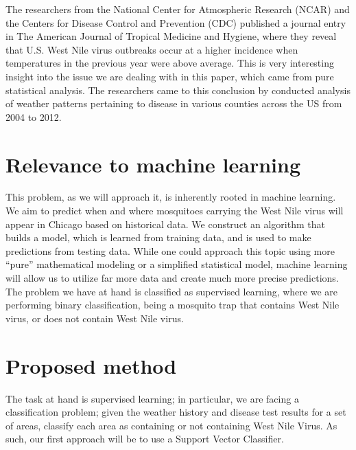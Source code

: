 \documentclass{article} %
\begin{document}
The researchers from the National Center for Atmospheric Research (NCAR) and the Centers for Disease Control and Prevention (CDC) published a journal entry in The American Journal of Tropical Medicine and Hygiene, where they reveal that U.S. West Nile virus outbreaks occur at a higher incidence when temperatures in the previous year were above average.  This is very interesting insight into the issue we are dealing with in this paper, which came from pure statistical analysis.  The researchers came to this conclusion by conducted analysis of weather patterns pertaining to disease in various counties across the US from 2004 to 2012.

\section{Relevance to machine learning}
This problem, as we will approach it, is inherently rooted in machine learning. We aim to predict when and where mosquitoes carrying the West Nile virus will appear in Chicago based on historical data. We construct an algorithm that builds a model, which is learned from training data, and is used to make predictions from testing data.  While one could approach this topic using more “pure” mathematical modeling or a simplified statistical model, machine learning will allow us to utilize far more data and create much more precise predictions.  The problem we have at hand is classified as supervised learning, where we are performing binary classification, being a mosquito trap that contains West Nile virus, or does not contain West Nile virus.

\section{Proposed method}
The task at hand is supervised learning; in particular, we are facing a classification problem; given the weather history and disease test results for a set of areas, classify each area as containing or not containing West Nile Virus. As such, our first approach will be to use a Support Vector Classifier. 
\end{document}
